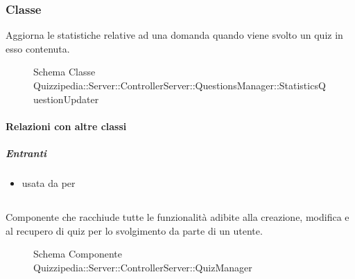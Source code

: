\subsubsection{Classe }
Aggiorna le statistiche relative ad una domanda quando viene svolto un quiz in esso contenuta.
\begin{figure}[H]
\centering
\noindent{}
\caption[Schema Classe StatisticsQuestionUpdater]{Schema Classe Quizzipedia::Server::ControllerServer::QuestionsManager::StatisticsQuestionUpdater}
\end{figure}
\paragraph{Relazioni con altre classi}
\subparagraph{Entranti}
\begin{itemize}
\item usata da  per 
\end{itemize}
\subsection{}
Componente che racchiude tutte le funzionalità adibite alla creazione, modifica e al recupero di quiz per lo svolgimento da parte di un utente.
\begin{figure}[H]
\centering
\noindent{}
\caption[Schema Componente Quizzipedia::Server::ControllerServer::QuizManager]{Schema Componente Quizzipedia::Server::ControllerServer::QuizManager}
\end{figure}
